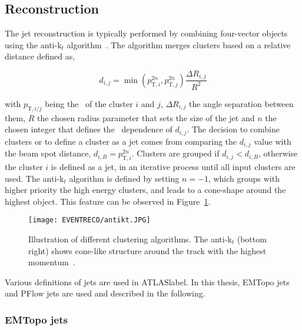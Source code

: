 \subsection{Reconstruction}

The jet reconstruction is typically performed by combining four-vector objects using the anti-k$_t$ algorithm~\cite{Cacciari_2008}. The algorithm merges clusters based on a relative distance defined as,

\begin{equation}
    d_{i,j} = \min (p_{\text{T},i}^{2n},p_{\text{T},j}^{2n}) \frac{\Delta R_{i,j}}{R^2}
\end{equation}

with $p_{\text{T},i/j}$ being the \pT\ of the cluster $i$ and $j$, $\Delta R_{i,j}$ the angle separation between them, $R$ the chosen radius parameter that sets the size of the jet and $n$ the chosen integer that defines the \pT\ dependence of $d_{i,j}$. The decision to combine clusters or to define a cluster as a jet comes from comparing the $d_{i,j}$ value with the beam spot distance, $d_{i,B} = p_{\text{T},i}^{2n}$. Clusters are grouped if $d_{i,j} < d_{i,B}$, otherwise the cluster $i$ is defined as a jet, in an iterative process until all input clusters are used. The anti-k$_t$ algorithm is defined by setting $n=-1$, which groups with higher priority the high energy clusters, and leads to a cone-shape around the highest object. This feature can be observed in Figure~\ref{figEVNTRECO:antikt}.\\

\begin{figure}[htbp]
    \RawFloats
    \begin{center}
    \texttt{[image: EVENTRECO/antikt.JPG]}
    \caption{
        Illustration of different clustering algorithms. The anti-k$_t$ (bottom right) shows cone-like structure around the track with the highest momentum~\cite{Cacciari_2008}. 
    }
    \label{figEVNTRECO:antikt}
    \end{center}
\end{figure}

Various definitions of jets are used in \acrshort{ATLASlabel}. In this thesis, EMTopo jets and PFlow jets are used and described in the following.

\subsubsection{EMTopo jets}

